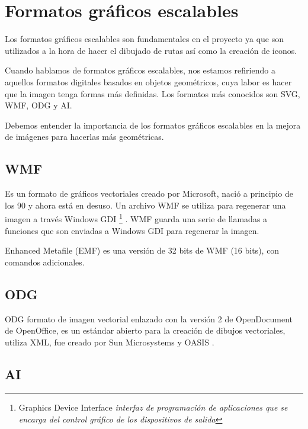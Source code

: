 \section{Formatos gráficos escalables}\label{formatos-graficos-escalables}

Los formatos gráficos escalables son fundamentales en el proyecto ya que son utilizados a la hora de hacer el dibujado de rutas así como la creación de iconos.

Cuando hablamos de formatos gráficos escalables, nos estamos refiriendo a aquellos formatos digitales basados en objetos geométricos, cuya labor es hacer que la imagen tenga formas m\'{a}s definidas.
Los formatos más conocidos son SVG, WMF, ODG  y AI.

Debemos entender la importancia de los formatos gráficos escalables en la mejora de imágenes para hacerlas más geométricas.


\subsection{WMF}\label{wmf}

Es un formato de gráficos vectoriales creado por Microsoft, nació a principio de los 90 y ahora está en desuso. Un archivo WMF se utiliza para regenerar una imagen a través Windows GDI \footnote{Graphics Device Interface \textit{interfaz de programación de aplicaciones que se encarga del control gráfico de los dispositivos de salida}} \hypertarget{_Hlk482387012}{. WMF guarda una serie de llamadas a funciones que son enviadas a Windows GDI para regenerar la imagen.} \cite{metaarchivo}

Enhanced Metafile (EMF) es una versión de 32 bits de WMF (16 bits), con comandos adicionales.



\subsection{ODG}\label{ODG}


ODG formato de imagen vectorial enlazado con la versión 2 de OpenDocument de OpenOffice, es un estándar abierto para la creación de dibujos vectoriales, utiliza XML, fue creado por Sun Microsystems y OASIS \cite{definicionodg}.





\subsection{AI}\label{ai}

